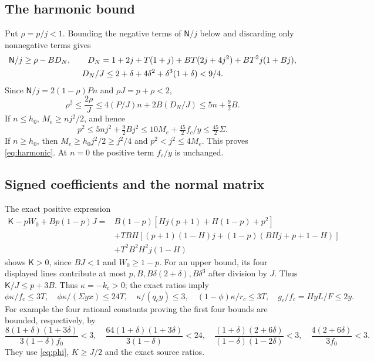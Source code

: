 \subsection*{The harmonic bound}
Put $\rho=p/j<1$. Bounding the negative terms of $\mathsf N/j$ below
and discarding only nonnegative terms gives
\begin{gather}
 \mathsf N/j\geq\rho-BD_N,\qquad
 D_N=1+2j+T(1+j)+BT(2j+4j^2)+BT^2j(1+Bj),\notag\\
 D_N/J\leq2+\delta+4\delta^2+\delta^3(1+\delta)<9/4.
 \label{eq:Nlower}
\end{gather}
Since $\mathsf N/j=2(1-\rho)Pn$ and $\rho J=p+\rho<2$,
\[
 \rho^2\leq\frac{2\rho}{J}
 \leq4(P/J)n+2B(D_N/J)
 \leq5n+\tfrac92B .
\]
If $n\leq h_0$, $M_e\geq nj^2/2$, and hence
\[
 p^2\leq5nj^2+\tfrac92Bj^2
 \leq10M_e+\tfrac{45}{2}f_c/y
 \leq\tfrac{45}{2}\Sigma .
\]
If $n\geq h_0$, then $M_e\geq h_0j^2/2\geq j^2/4$ and $p^2<j^2\leq4M_e$.
This proves \eqref{eq:harmonic}. At $n=0$ the positive term $f_c/y$
is unchanged.

\subsection*{Signed coefficients and the normal matrix}
The exact positive expression
\begin{align*}
 \mathsf K-pW_0+Bp(1-p)J
 ={}&B(1-p)[Hj(p+1)+H(1-p)+p^2]\\
 &+TBH[(p+1)(1-H)j+(1-p)(BHj+p+1-H)]\\
 &+T^2B^2H^2j(1-H)
\end{align*}
shows $\mathsf K>0$, since $BJ<1$ and $W_0\geq1-p$.
For an upper bound, its four displayed lines contribute at most
$p,B,B\delta(2+\delta),B\delta^3$ after division by $J$.
Thus $\mathsf K/J\leq p+3B$.
Thus $\kappa=-k_c>0$; the exact ratios imply
\begin{equation}
 \phi\kappa/f_c\leq3T,\quad
 \phi\kappa/(\Sigma yx)\leq24T,\quad
 \kappa/(q_cy)\leq3,\quad
 (1-\phi)\kappa/r_c\leq3T,\quad
 g_c/f_c=HyL/F\leq2y.
 \label{eq:kappabounds}
\end{equation}
For example the four rational constants proving the first four bounds are
bounded, respectively, by
\[
 \frac{8(1+\delta)(1+3\delta)}{3(1-\delta)f_0}<3,\quad
 \frac{64(1+\delta)(1+3\delta)}{3(1-\delta)}<24,\quad
 \frac{(1+\delta)(2+6\delta)}{(1-\delta)(1-2\delta)}<3,\quad
 \frac{4(2+6\delta)}{3f_0}<3.
\]
They use \eqref{eq:phi}, $K\geq J/2$ and the exact source ratios.

